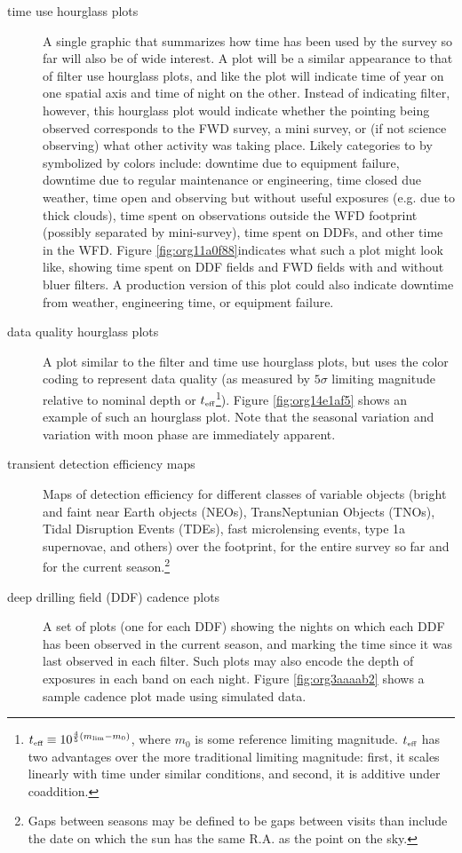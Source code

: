 \begin{description}
\item[{time use hourglass plots}] A single graphic that summarizes how time has been used by the survey so far will also be of wide interest. A plot will be a similar appearance to that of filter use hourglass plots, and like the plot will indicate time of year on one spatial axis and time of night on the other. Instead of indicating filter, however, this hourglass plot would indicate whether the pointing being observed corresponds to the FWD survey, a mini survey, or (if not science observing) what other activity was taking place. Likely categories to by symbolized by colors include: downtime due to equipment failure, downtime due to regular maintenance or engineering, time closed due weather, time open and observing but without useful exposures (e.g. due to thick clouds), time spent on observations outside the WFD footprint (possibly separated by mini-survey), time spent on DDFs, and other time in the WFD. Figure \ref{fig:org11a0f88}indicates what such a plot might look like, showing time spent on DDF fields and FWD fields with and without bluer filters. A production version of this plot could also indicate downtime from weather, engineering time, or equipment failure.
\item[{data quality hourglass plots}] A plot similar to the filter and time use hourglass plots, but uses the color coding to represent data quality (as measured by \(5\sigma\) limiting magnitude relative to nominal depth or \(t_{\mbox{\tiny eff}}\)\footnote{\(t_{\mbox{\tiny eff}} \equiv 10^{\frac{4}{5}(m_{\mbox{\tiny lim}} - m_{0})}\), where \(m_{0}\) is some reference limiting magnitude. \(t_{\mbox{\tiny eff}}\) has two advantages over the more traditional limiting magnitude: first, it scales linearly with time under similar conditions, and second, it is additive under coaddition.}). Figure \ref{fig:org14e1af5} shows an example of such an hourglass plot. Note that the seasonal variation and variation with moon phase are immediately apparent.
\item[{transient detection efficiency maps}] Maps of detection efficiency for different classes of variable objects (bright and faint near Earth objects (NEOs), TransNeptunian Objects (TNOs), Tidal Disruption Events (TDEs), fast microlensing events, type 1a supernovae, and others) over the footprint, for the entire survey so far and for the current season.\footnote{Gaps between seasons may be defined to be gaps between visits than include the date on which the sun has the same R.A. as the point on the sky.}
\item[{deep drilling field (DDF) cadence plots}] A set of plots (one for each DDF) showing the nights on which each DDF has been observed in the current season, and marking the time since it was last observed in each filter. Such plots may also encode the depth of exposures in each band on each night. Figure \ref{fig:org3aaaab2} shows a sample cadence plot made using simulated data.

\end{description}
